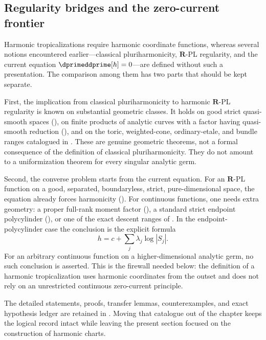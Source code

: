 \subsection{Regularity bridges and the zero-current frontier}
\label{sec:ch18-regularity-bridges}

Harmonic tropicalizations require harmonic coordinate functions, whereas
several notions encountered earlier---classical pluriharmonicity,
$\mathbf R$-PL regularity, and the current equation
$\dprimeddprime[h]=0$---are defined without such a presentation.  The
comparison among them has two parts that should be kept separate.

First, the implication from classical pluriharmonicity to harmonic
$\mathbf R$-PL regularity is known on substantial geometric classes.  It
holds on good strict quasi-smooth spaces
(), on finite products of analytic curves
with a factor having quasi-smooth reduction
(), and on the toric,
weighted-cone, ordinary-etale, and bundle ranges catalogued in
.  These are genuine geometric theorems,
not a formal consequence of the definition of classical pluriharmonicity.
They do not amount to a uniformization theorem for every singular analytic
germ.

Second, the converse problem starts from the current equation.  For an
$\mathbf R$-PL function on a good, separated, boundaryless, strict,
pure-dimensional space, the equation already forces harmonicity
().  For continuous functions,
one needs extra geometry: a proper full-rank moment factor
(), a standard strict endpoint
polycylinder (), or one of
the exact descent ranges of .  In the
endpoint-polycylinder case the conclusion is the explicit formula
\[
                      h=c+\sum_j\lambda_j\log|S_j|.
\]
For an arbitrary continuous function on a higher-dimensional analytic germ,
no such conclusion is asserted.  This is the firewall needed below: the
definition of a harmonic tropicalization uses harmonic coordinates from the
outset and does not rely on an unrestricted continuous zero-current
principle.

The detailed statements, proofs, transfer lemmas, counterexamples, and exact
hypothesis ledger are retained in
.  Moving that catalogue out of the chapter keeps
the logical record intact while leaving the present section focused on the
construction of harmonic charts.

